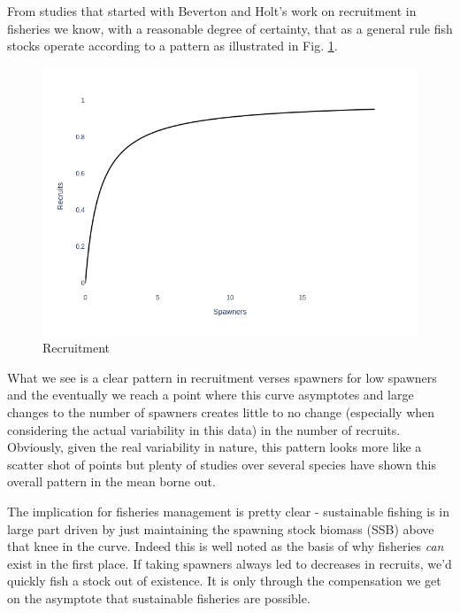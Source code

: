 \documentclass[11pt]{article}
\begin{document}
From studies that started with Beverton and Holt's work on recruitment in fisheries we know, with a reasonable degree of certainty, that as a general rule fish stocks operate according to a pattern as illustrated in Fig. \ref{fig:recruitment}.

\begin{figure}[h!] 
  \includegraphics[width=\linewidth]{recruitment.png}
  \caption{Recruitment}
  \label{fig:recruitment}
\end{figure}

What we see is a clear pattern in recruitment verses spawners for low spawners and the eventually we reach a point where this curve asymptotes and large changes to the number of spawners creates little to no change (especially when considering the actual variability in this data) in the number of recruits. Obviously, given the real variability in nature, this pattern looks more like a scatter shot of points but plenty of studies over several species have shown this overall pattern in the mean borne out. \newline

The implication for fisheries management is pretty clear - sustainable fishing is in large part driven by just maintaining the spawning stock biomass (SSB) above that knee in the curve. Indeed this is well noted as the basis of why fisheries \textit{can} exist in the first place. If taking spawners always led to decreases in recruits, we'd quickly fish a stock out of existence. It is only through the compensation we get on the asymptote that sustainable fisheries are possible. \newline
\end{document}
